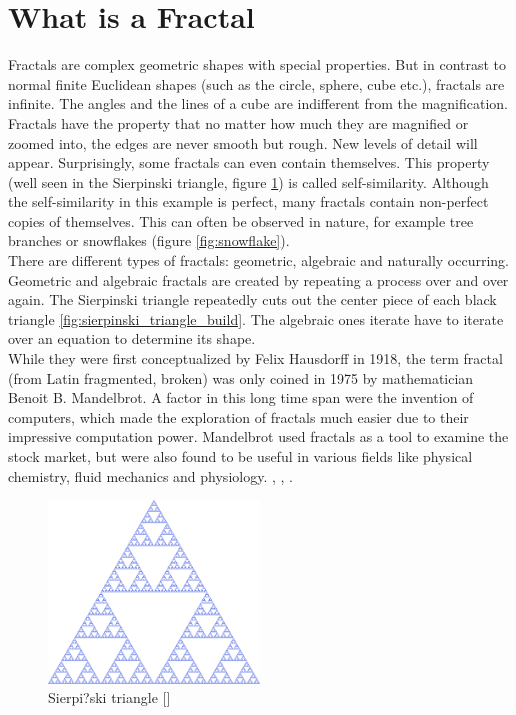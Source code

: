 \documentclass[10pt,a4paper,titlepage]{article}
\begin{document}
	\section{What is a Fractal}
	Fractals are complex geometric shapes with special properties. But in contrast to normal finite Euclidean shapes (such as the circle, sphere, cube etc.), fractals are infinite. The angles and the lines of a cube are indifferent from the magnification. Fractals have the property that no matter how much they are magnified or zoomed into, the edges are never smooth but rough. New levels of detail will appear. Surprisingly, some fractals can even contain themselves. This property (well seen in the Sierpinski triangle, figure \ref{fig:sierpinski_triangle}) is called self-similarity. Although the self-similarity in this example is perfect, many fractals contain non-perfect copies of themselves. This can often be observed in nature, for example tree branches or snowflakes (figure \ref{fig:snowflake}).\\
	There are different types of fractals: geometric, algebraic and naturally occurring. Geometric and algebraic fractals are created by repeating a process over and over again. The Sierpinski triangle repeatedly cuts out the center piece of each black triangle \ref{fig:sierpinski_triangle_build}. The algebraic ones iterate have to iterate over an equation to determine its shape.\\
	While they were first conceptualized by Felix Hausdorff in 1918, the term fractal (from Latin fragmented, broken) was only coined in 1975 by mathematician Benoit B. Mandelbrot. A factor in this long time span were the invention of computers, which made the exploration of fractals much easier due to their impressive computation power. Mandelbrot used fractals as a tool to examine the stock market, but were also found to be useful in various fields like physical chemistry, fluid mechanics and physiology. \cite{FractalFoundation}, \cite{FractalFoundation}, \cite{britannica}.
	\begin{figure}[h]
		\caption{Sierpi?ski triangle [\cite{Sierpinski}]}
		\label{fig:sierpinski_triangle}
		\centering
		\includegraphics[width=0.5\textwidth]{"res/images/1000px-Sierpinski_triangle.svg.png"}
	\end{figure}
\end{document}
